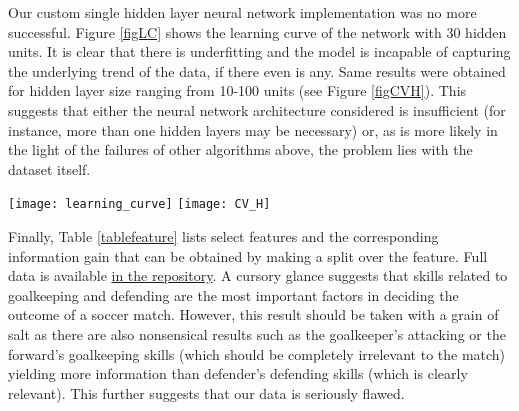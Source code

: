 \documentclass[a4paper,11pt,table]{article}
\begin{document}
Our custom single hidden layer neural network implementation was no more successful. Figure \ref{figLC} shows the learning curve of the network with 30 hidden units. It is clear that there is underfitting and the model is incapable of capturing the underlying trend of the data, if there even is any. Same results were obtained for hidden layer size ranging from 10-100 units (see Figure \ref{figCVH}). This suggests that either the neural network architecture considered is insufficient (for instance, more than one hidden layers may be necessary) or, as is more likely in the light of the failures of other algorithms above, the problem lies with the dataset itself.

\begin{center}
    \texttt{[image: learning\_curve]}
    \texttt{[image: CV\_H]}
\end{center}

Finally, Table \ref{tablefeature} lists select features and the corresponding information gain that can be obtained by making a split over the feature. Full data is available \href{https://github.com/TheLordBlarg/Soccer_Success/blob/master/results/entropy_train.csv}{in the repository}. A cursory glance suggests that skills related to goalkeeping and defending are the most important factors in deciding the outcome of a soccer match. However, this result should be taken with a grain of salt as there are also nonsensical results such as the goalkeeper's attacking or the forward's goalkeeping skills (which should be completely irrelevant to the match) yielding more information than defender's defending skills (which is clearly relevant). This further suggests that our data is seriously flawed.
\end{document}
